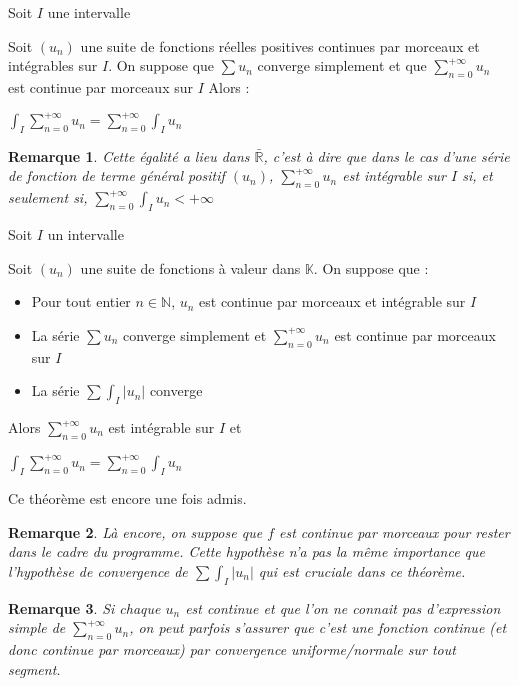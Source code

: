 \documentclass[a4paper,12pt]{book}
\newcommand{\Thr}[2]{\begin{tcolorbox}[sharp corners, colback=white,colframe=red!90!black!75, title=Théorème : #1]#2\end{tcolorbox}}
\newcommand{\Pre}[1]{\begin{tcolorbox}[sharp corners, colback=white,colframe=green!60!green!30!black!75, title=Preuve]#1\end{tcolorbox}}
\newtheorem{Rem}{Remarque}[section]
\def\R{\mathbb{R}}
\def\N{\mathbb{N}}
\def\K{\mathbb{K}}
\begin{document}
\Thr{Intégration terme à terme positif}{Soit $I$ une intervalle \par Soit $(u_n)$ une suite de fonctions réelles positives continues par morceaux et intégrables sur $I$. On suppose que $\sum u_n$ converge simplement et que $\sum\limits_{n=0}^{+\infty}u_n$ est continue par morceaux sur $I$
Alors : \par \begin{center}$\int_I\sum\limits_{n=0}^{+\infty}u_n = \sum\limits_{n=0}^{+\infty}\int_I u_n$ \end{center}}
\begin{Rem}
Cette égalité a lieu dans $\bar{\R}$, c'est à dire que dans le cas d'une série de fonction de terme général positif $(u_n)$, $\sum\limits_{n=0}^{+\infty}u_n$ est intégrable sur $I$ si, et seulement si, $\sum\limits_{n=0}^{+\infty}\int_Iu_n<+\infty$
\end{Rem}
\Thr{Intégration terme à terme}{Soit $I$ un intervalle \par Soit $(u_n)$ une suite de fonctions à valeur dans $\K$. On suppose que :\begin{itemize}
\item Pour tout entier $n\in\N$, $u_n$ est continue par morceaux et intégrable sur $I$
\item La série $\sum u_n$ converge simplement et $\sum\limits_{n=0}^{+\infty}u_n$ est continue par morceaux sur $I$
\item La série $\sum\int_I\vert u_n\vert$ converge
\end{itemize}
Alors $\sum\limits_{n=0}^{+\infty}u_n$ est intégrable sur $I$ et \par \begin{center}$\int_I\sum\limits_{n=0}^{+\infty}u_n=\sum\limits_{n=0}^{+\infty}\int_Iu_n$\end{center}}
\Pre{Ce théorème est encore une fois admis.}
\begin{Rem}
Là encore, on suppose que $f$ est continue par morceaux pour rester dans le cadre du programme. Cette hypothèse n'a pas la même importance que l'hypothèse de convergence de $\sum\int_I\vert u_n\vert$ qui est cruciale dans ce théorème.
\end{Rem}
\begin{Rem}
Si chaque $u_n$ est continue et que l'on ne connait pas d'expression simple de $\sum\limits_{n=0}^{+\infty}u_n$, on peut parfois s'assurer que c'est une fonction continue (et donc continue par morceaux) par convergence uniforme/normale sur tout segment.
\end{Rem}
\end{document}
